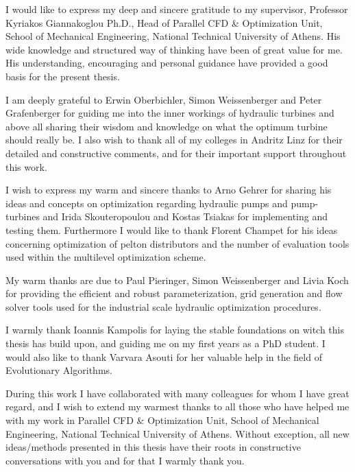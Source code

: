 

\begin{acknowledgements}      %
I would like to express my deep and sincere gratitude to my supervisor, Professor Kyriakos Giannakoglou Ph.D., Head of Parallel CFD \& Optimization Unit, School of Mechanical Engineering, National Technical University of Athens. His wide knowledge and structured way of thinking have been of great value for me. His understanding, encouraging and personal guidance have provided a good basis for the present thesis.

I am deeply grateful to Erwin Oberbichler, Simon Weissenberger and Peter Grafenberger for guiding me into the inner workings of hydraulic turbines and above all sharing their wisdom and knowledge on what the optimum turbine should really be. I also wish to thank all of my colleges in Andritz Linz for their detailed and constructive comments, and for their important support throughout this work. 

I wish to express my warm and sincere thanks to Arno Gehrer for sharing his ideas and concepts on optimization regarding hydraulic pumps and pump-turbines and Irida Skouteropoulou and Kostas Tsiakas for implementing and testing them. Furthermore I would like to thank  Florent Champet for his ideas concerning optimization of pelton distributors and the number of evaluation tools used within the multilevel optimization scheme. 

My warm thanks are due to Paul Pieringer, Simon Weissenberger and Livia Koch for providing the efficient and robust parameterization, grid generation and flow solver tools used for the industrial scale hydraulic optimization procedures.      

I warmly thank Ioannis Kampolis for laying the stable foundations on witch this thesis has build upon, and guiding me on my first years as a PhD student. I would also like to thank Varvara Asouti for her valuable help in the field of Evolutionary Algorithms.

During this work I have collaborated with many colleagues for whom I have great regard, and I wish to extend my warmest thanks to all those who have helped me with my work in Parallel CFD \& Optimization Unit, School of Mechanical Engineering, National Technical University of Athens. Without exception, all new ideas/methods presented in this thesis have their roots in constructive conversations with you and for that I warmly thank you.   


\end{acknowledgements}
